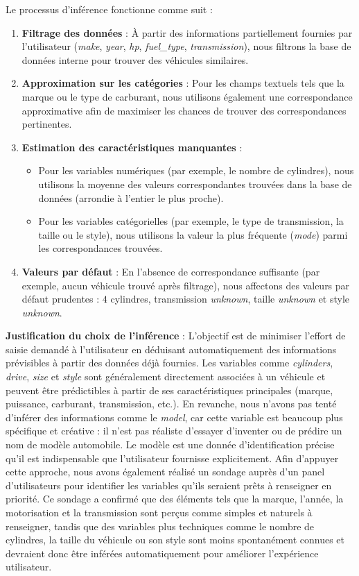 \documentclass[12pt]{report}
\begin{document}
Le processus d'inférence fonctionne comme suit :
\begin{enumerate}
    \item \textbf{Filtrage des données} : À partir des informations partiellement fournies par l'utilisateur (\textit{make}, \textit{year}, \textit{hp}, \textit{fuel\_type}, \textit{transmission}), nous filtrons la base de données interne pour trouver des véhicules similaires.
    \item \textbf{Approximation sur les catégories} : Pour les champs textuels tels que la marque ou le type de carburant, nous utilisons également une correspondance approximative afin de maximiser les chances de trouver des correspondances pertinentes.
    \item \textbf{Estimation des caractéristiques manquantes} : 
    \begin{itemize}
        \item Pour les variables numériques (par exemple, le nombre de cylindres), nous utilisons la moyenne des valeurs correspondantes trouvées dans la base de données (arrondie à l'entier le plus proche).
        \item Pour les variables catégorielles (par exemple, le type de transmission, la taille ou le style), nous utilisons la valeur la plus fréquente (\textit{mode}) parmi les correspondances trouvées.
    \end{itemize}
    \item \textbf{Valeurs par défaut} : En l'absence de correspondance suffisante (par exemple, aucun véhicule trouvé après filtrage), nous affectons des valeurs par défaut prudentes : \(4\) cylindres, transmission \textit{unknown}, taille \textit{unknown} et style \textit{unknown}.
\end{enumerate}

\textbf{Justification du choix de l'inférence} :  
L'objectif est de minimiser l'effort de saisie demandé à l'utilisateur en déduisant automatiquement des informations prévisibles à partir des données déjà fournies. Les variables comme \textit{cylinders}, \textit{drive}, \textit{size} et \textit{style} sont généralement directement associées à un véhicule et peuvent être prédictibles à partir de ses caractéristiques principales (marque, puissance, carburant, transmission, etc.).  
En revanche, nous n'avons pas tenté d'inférer des informations comme le \textit{model}, car cette variable est beaucoup plus spécifique et créative : il n'est pas réaliste d'essayer d'inventer ou de prédire un nom de modèle automobile. Le modèle est une donnée d'identification précise qu'il est indispensable que l'utilisateur fournisse explicitement.  
Afin d'appuyer cette approche, nous avons également réalisé un sondage auprès d'un panel d'utilisateurs pour identifier les variables qu'ils seraient prêts à renseigner en priorité. Ce sondage a confirmé que des éléments tels que la marque, l'année, la motorisation et la transmission sont perçus comme simples et naturels à renseigner, tandis que des variables plus techniques comme le nombre de cylindres, la taille du véhicule ou son style sont moins spontanément connues et devraient donc être inférées automatiquement pour améliorer l'expérience utilisateur.
\end{document}

